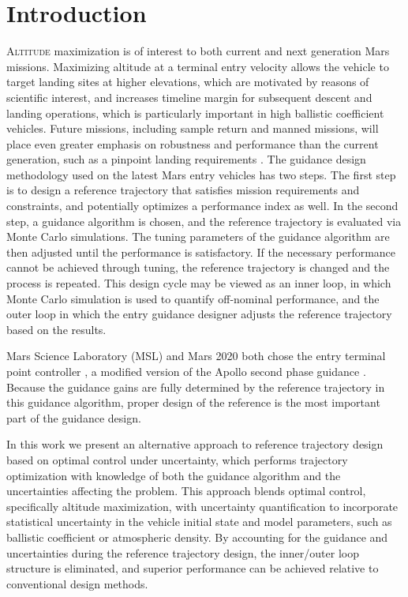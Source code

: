 \documentclass[journal ]{new-aiaa}
\begin{document}
\section*{Introduction}
\lettrine{A}{ltitude} maximization is of interest to both current and next generation Mars missions. Maximizing altitude at a terminal entry velocity allows the vehicle to target landing sites at higher elevations, which are motivated by reasons of scientific interest, and increases timeline margin for subsequent descent and landing operations, which is particularly important in high ballistic coefficient vehicles.
Future missions, including sample return \cite{MSR} and manned missions, will place even greater emphasis on robustness and performance than the current generation, such as a pinpoint landing requirements \cite{EvolvableMars}. The guidance design methodology used on the latest Mars entry vehicles has two steps. The first step is to design a reference trajectory that satisfies mission requirements and constraints, and potentially optimizes a performance index as well. In the second step, a guidance algorithm is chosen, and the reference trajectory is evaluated via Monte Carlo simulations. The tuning parameters of the guidance algorithm are then adjusted until the performance is satisfactory. If the necessary performance cannot be achieved through tuning, the reference trajectory is changed and the process is repeated. This design cycle may be viewed as an inner loop, in which Monte Carlo simulation is used to quantify off-nominal performance, and the outer loop in which the entry guidance designer adjusts the reference trajectory based on the results. 

Mars Science Laboratory (MSL) and Mars 2020 both chose the entry terminal point controller \cite{MSL_EDL,M2020_EDL}, a modified version of the Apollo second phase guidance \cite{MSL_EDL2}. Because the guidance gains are fully determined by the reference trajectory in this guidance algorithm, proper design of the reference is the most important part of the guidance design. 

In this work we present an alternative approach to reference trajectory design based on optimal control under uncertainty, which performs trajectory optimization with knowledge of both the guidance algorithm and the uncertainties affecting the problem. This approach blends optimal control, specifically altitude maximization, with uncertainty quantification to incorporate statistical uncertainty in the vehicle initial state and model parameters, such as ballistic coefficient or atmospheric density. By accounting for the guidance and uncertainties during the reference trajectory design, the inner/outer loop structure is eliminated, and superior performance can be achieved relative to conventional design methods.
\end{document}
